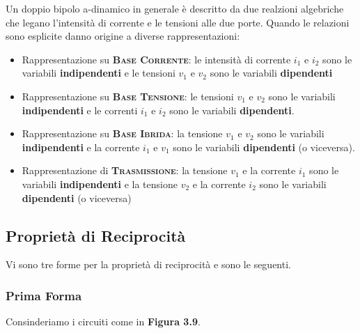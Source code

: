 \documentclass[a4paper]{report}
\begin{document}
Un doppio bipolo a-dinamico in generale \`e descritto da due realzioni
algebriche che legano l'intensit\`a di corrente e le tensioni alle due
porte. Quando le relazioni sono esplicite danno origine a diverse
rappresentazioni:

\begin{itemize}
  \item Rappresentazione su {\textsc{\bf Base Corrente}}: le
    intensit\`a di corrente $i_1$ e $i_2$ sono le variabili {\bf
      indipendenti} e le tensioni $v_1$ e $v_2$ sono le variabili {\bf
    dipendenti}
  \item Rappresentazione su {\textsc{\bf Base Tensione}}: le tensioni
    $v_1$ e $v_2$ sono le variabili {\bf indipendenti} e le correnti
    $i_1$ e $i_2$ sono le variabili {\bf dipendenti}.
  \item Rappresentazione su {\textsc{\bf Base Ibrida}}: la tensione
    $v_1$ e $v_2$ sono le variabili {\bf indipendenti} e la corrente
    $i_1$ e $v_1$ sono le variabili {\bf dipendenti} (o viceversa).
  \item Rappresentazione di {\textsc{\bf Trasmissione}}: la tensione
    $v_1$ e la corrente $i_1$ sono le variabili {\bf indipendenti} e
    la tensione $v_2$ e la corrente $i_2$ sono le variabili {\bf
      dipendenti} (o viceversa)
\end{itemize}

\subsection{Propriet\`a di Reciprocit\`a}

Vi sono tre forme per la propriet\`a di reciprocit\`a e sono le
seguenti.

\subsubsection{Prima Forma}\label{subsubsec:repPrimaForma}
Consinderiamo i circuiti come in {\bf Figura 3.9}.
\end{document}
